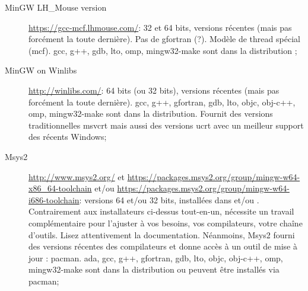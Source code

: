 \begin{description}
\item[MinGW LH\_Mouse version] \url{https://gcc-mcf.lhmouse.com/}: 32 et 64 bits, versions récentes (mais pas forcément la toute dernière). Pas de gfortran (?). Modèle de thread spécial (mcf).  gcc, g++, gdb, lto, omp, mingw32-make sont dans la distribution ;
\item[MinGW on Winlibs] \url{http://winlibs.com/}: 64 bits (ou 32 bits), versions récentes (mais pas forcément la toute dernière). gcc, g++, gfortran, gdb, lto, objc, obj-c++, omp, mingw32-make sont dans la distribution. Fournit des versions traditionnelles msvcrt mais aussi des versions ucrt avec un meilleur support des récents Windows;
\item[Msys2] \url{http://www.msys2.org/} et \url{https://packages.msys2.org/group/mingw-w64-x86_64-toolchain} et/ou \url{https://packages.msys2.org/group/mingw-w64-i686-toolchain}: versions 64 et/ou 32 bits, installées dans  et/ou . Contrairement aux installateurs ci-dessus tout-en-un, nécessite un travail complémentaire pour l'ajuster à vos besoins, vos compilateurs, votre chaîne d'outils. Lisez attentivement la documentation. Néanmoins, Msys2 fourni des versions récentes des compilateurs et donne accès à un outil de mise à jour : pacman. ada, gcc, g++, gfortran, gdb, lto, objc, obj-c++, omp, mingw32-make sont dans la distribution ou peuvent être installés via pacman;
\end{description}



